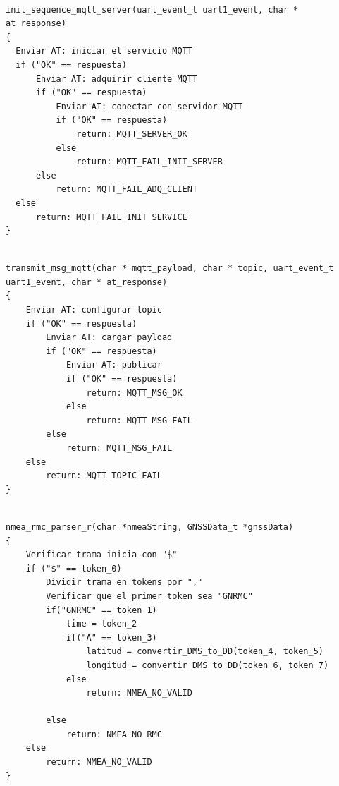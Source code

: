  


\begin{lstlisting}[label=cod:init_sequence_mqtt_server, caption=Pseudocódigo de la función init\_sequence\_mqtt\_server().] 

init_sequence_mqtt_server(uart_event_t uart1_event, char * at_response)
{
  Enviar AT: iniciar el servicio MQTT
  if ("OK" == respuesta)
      Enviar AT: adquirir cliente MQTT
      if ("OK" == respuesta)
          Enviar AT: conectar con servidor MQTT
	      if ("OK" == respuesta)
	          return: MQTT_SERVER_OK
	      else 
	          return: MQTT_FAIL_INIT_SERVER
      else
          return: MQTT_FAIL_ADQ_CLIENT
  else
      return: MQTT_FAIL_INIT_SERVICE	
}

\end{lstlisting}
 




\begin{lstlisting}[label=cod:transmit_msg_mqtt, caption=Pseudocódigo de la función init\_sequence\_mqtt\_server().] 

transmit_msg_mqtt(char * mqtt_payload, char * topic, uart_event_t uart1_event, char * at_response)
{
	Enviar AT: configurar topic
	if ("OK" == respuesta)
		Enviar AT: cargar payload
		if ("OK" == respuesta)
			Enviar AT: publicar
			if ("OK" == respuesta)
				return: MQTT_MSG_OK
			else
				return: MQTT_MSG_FAIL
		else
			return: MQTT_MSG_FAIL
	else
		return: MQTT_TOPIC_FAIL
}

\end{lstlisting}

 


\begin{lstlisting}[label=cod:nmea_rmc_parser_r, caption=Pseudocódigo de la función nmea\_rmc\_parser\_r().] 

nmea_rmc_parser_r(char *nmeaString, GNSSData_t *gnssData)
{
	Verificar trama inicia con "$"
	if ("$" == token_0)
		Dividir trama en tokens por ","
		Verificar que el primer token sea "GNRMC"
		if("GNRMC" == token_1)
			time = token_2 
			if("A" == token_3)
				latitud = convertir_DMS_to_DD(token_4, token_5)
				longitud = convertir_DMS_to_DD(token_6, token_7)
			else
				return: NMEA_NO_VALID			
			 
		else
			return: NMEA_NO_RMC
	else
		return: NMEA_NO_VALID
}

\end{lstlisting}




